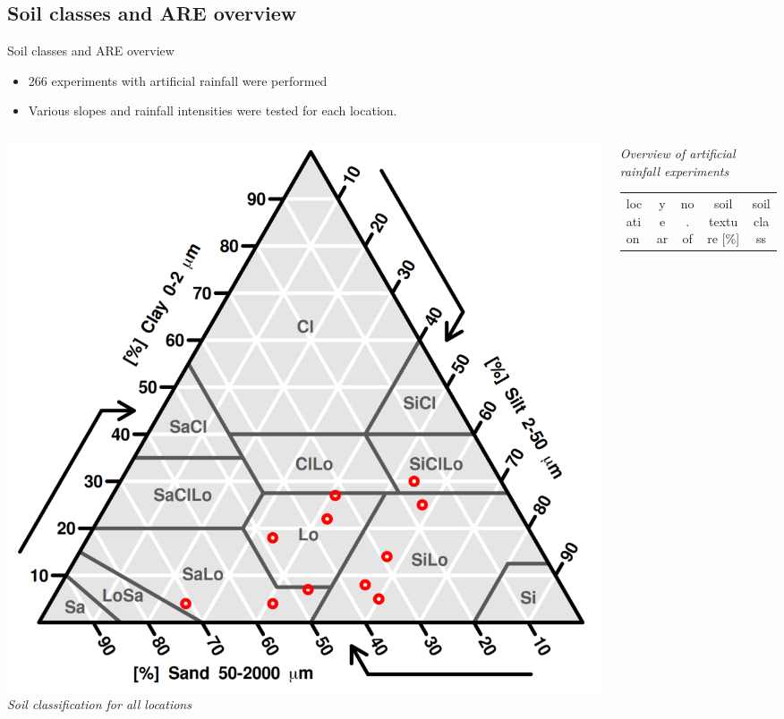 \subsection{Soil classes and ARE overview}
\begin{block}{Soil classes and ARE overview}
    \begin{itemize}
        \item 266 experiments with artificial rainfall were performed 
        \item Various slopes and rainfall intensities were tested for each location.
    \end{itemize}\vspace{-0.25cm}

    \begin{columns}
        \begin{column}{0.4\textwidth}
            \includegraphics[width=.95\textwidth]{obr/soil_triangle.png}
            {\it Soil classification for all locations}
        \end{column}
        \begin{column}{0.6\textwidth}
            {\it Overview of artificial rainfall experiments}
            {\small 
            \begin{table}[]
                \begin{tabular}{lcccccc}
                \hline
                \hline
                location      & year    & no. of            & \multicolumn{3}{c}{soil texture {[}\%{]}}  & soil class      \\

\end{tabular}
\end{table}}
\end{column}
\end{columns}
\end{block}

